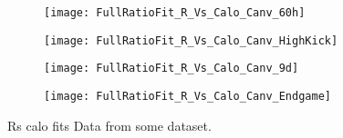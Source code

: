 \begin{figure}[]
\centering
    \begin{subfigure}[]{0.45\textwidth}
        \centering
        \texttt{[image: FullRatioFit\_R\_Vs\_Calo\_Canv\_60h]}
        \caption{}
    \end{subfigure}%
    \begin{subfigure}[]{0.45\textwidth}
        \centering
        \texttt{[image: FullRatioFit\_R\_Vs\_Calo\_Canv\_HighKick]}
        \caption{}
    \end{subfigure}

    \begin{subfigure}[]{0.45\textwidth}
        \centering
        \texttt{[image: FullRatioFit\_R\_Vs\_Calo\_Canv\_9d]}
        \caption{}
    \end{subfigure}%
    \begin{subfigure}[]{0.45\textwidth}
        \centering
        \texttt{[image: FullRatioFit\_R\_Vs\_Calo\_Canv\_Endgame]}
        \caption{}
    \end{subfigure}
\caption[]{Rs calo fits Data from some dataset.}
\label{fig:}
\end{figure}


